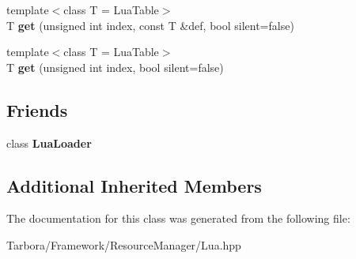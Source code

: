 \begin{DoxyCompactItemize}
\item 
\mbox{\label{classTarbora_1_1LuaScript_ab65fb78ea22ec1753e457604d36ba856}} 
{\footnotesize template$<$class T  = Lua\+Table$>$ }\\T {\bfseries get} (unsigned int index, const T \&def, bool silent=false)
\item 
\mbox{\label{classTarbora_1_1LuaScript_ad38a80bcfed6517c8095949914e3b8ae}} 
{\footnotesize template$<$class T  = Lua\+Table$>$ }\\T {\bfseries get} (unsigned int index, bool silent=false)
\end{DoxyCompactItemize}
\subsection*{Friends}
\begin{DoxyCompactItemize}
\item 
\mbox{\label{classTarbora_1_1LuaScript_a85fe40632bd02db35186675155d41ca8}} 
class {\bfseries Lua\+Loader}
\end{DoxyCompactItemize}
\subsection*{Additional Inherited Members}


The documentation for this class was generated from the following file\+:\begin{DoxyCompactItemize}
\item 
Tarbora/\+Framework/\+Resource\+Manager/Lua.\+hpp\end{DoxyCompactItemize}

